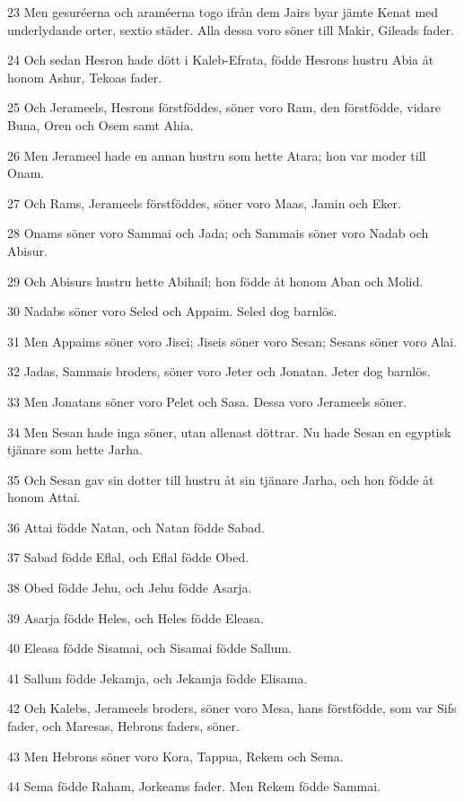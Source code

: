 \par 23 Men gesuréerna och araméerna togo ifrån dem Jairs byar jämte Kenat med underlydande orter, sextio städer. Alla dessa voro söner till Makir, Gileads fader.
\par 24 Och sedan Hesron hade dött i Kaleb-Efrata, födde Hesrons hustru Abia åt honom Ashur, Tekoas fader.
\par 25 Och Jerameels, Hesrons förstföddes, söner voro Ram, den förstfödde, vidare Buna, Oren och Osem samt Ahia.
\par 26 Men Jerameel hade en annan hustru som hette Atara; hon var moder till Onam.
\par 27 Och Rams, Jerameels förstföddes, söner voro Maas, Jamin och Eker.
\par 28 Onams söner voro Sammai och Jada; och Sammais söner voro Nadab och Abisur.
\par 29 Och Abisurs hustru hette Abihail; hon födde åt honom Aban och Molid.
\par 30 Nadabs söner voro Seled och Appaim. Seled dog barnlös.
\par 31 Men Appaims söner voro Jisei; Jiseis söner voro Sesan; Sesans söner voro Alai.
\par 32 Jadas, Sammais broders, söner voro Jeter och Jonatan. Jeter dog barnlös.
\par 33 Men Jonatans söner voro Pelet och Sasa. Dessa voro Jerameels söner.
\par 34 Men Sesan hade inga söner, utan allenast döttrar. Nu hade Sesan en egyptisk tjänare som hette Jarha.
\par 35 Och Sesan gav sin dotter till hustru åt sin tjänare Jarha, och hon födde åt honom Attai.
\par 36 Attai födde Natan, och Natan födde Sabad.
\par 37 Sabad födde Eflal, och Eflal födde Obed.
\par 38 Obed födde Jehu, och Jehu födde Asarja.
\par 39 Asarja födde Heles, och Heles födde Eleasa.
\par 40 Eleasa födde Sisamai, och Sisamai födde Sallum.
\par 41 Sallum födde Jekamja, och Jekamja födde Elisama.
\par 42 Och Kalebs, Jerameels broders, söner voro Mesa, hans förstfödde, som var Sifs fader, och Maresas, Hebrons faders, söner.
\par 43 Men Hebrons söner voro Kora, Tappua, Rekem och Sema.
\par 44 Sema födde Raham, Jorkeams fader. Men Rekem födde Sammai.
